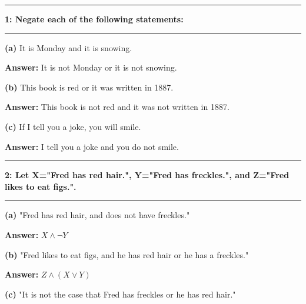 \documentclass[11pt]{article}
\newcommand\question[2]{\vspace{.25in}\hrule\textbf{#1: #2}\vspace{.5em}\hrule\vspace{.10in}}
\renewcommand\part[1]{\vspace{.10in}\textbf{(#1)}}
\newcommand\answer{\vspace{.10in}\textbf{Answer: }}
\begin{document}
\raggedright
\newcommand\NAME{Stewart Dulaney}  %
\newcommand\SID{1545566}     %
\newcommand\HWNUM{1}              %

\question{1}{Negate each of the following statements:} 

\part{a} It is Monday and it is snowing.

\answer It is not Monday or it is not snowing.

\part{b} This book is red or it was written in 1887.

\answer This book is not red and it was not written in 1887.

\part{c} If I tell you a joke, you will smile.

\answer I tell you a joke and you do not smile.

\question{2}{Let X="Fred has red hair.",  Y="Fred has freckles.", and Z="Fred likes to eat figs.".}

\part{a} "Fred has red hair, and does not have freckles."

\answer $X \land \lnot Y$

\part{b} "Fred likes to eat figs, and he has red hair or he has a freckles."

\answer $Z \land (X \lor Y)$

\part{c} "It is not the case that Fred has freckles or he has red hair."
\end{document}
